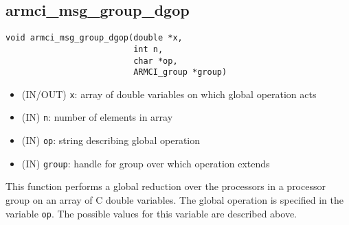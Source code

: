 \documentclass[12pt]{article}
\begin{document}
\subsection{armci\_msg\_group\_dgop}
\begin{verbatim}
void armci_msg_group_dgop(double *x,
                          int n,
                          char *op,
                          ARMCI_group *group)
\end{verbatim}
\begin{itemize}
\item (IN/OUT) \texttt{x}: array of double variables on which global operation acts
\item (IN) \texttt{n}: number of elements in array
\item (IN) \texttt{op}: string describing global operation
\item (IN) \texttt{group}: handle for group over which operation extends
\end{itemize}
This function performs a global reduction over the processors in a processor
group on an array of C double variables. The global
operation is specified in the variable \texttt{op}. The possible values for this
variable are described above.
\end{document}
